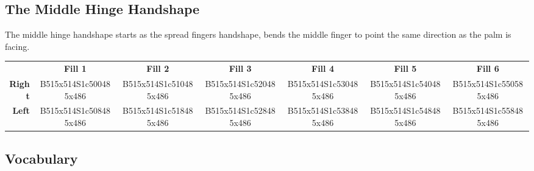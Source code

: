 \documentclass{article}
\begin{document}
\subsection{The Middle Hinge Handshape}

The middle hinge handshape starts as the spread fingers handshape, bends the middle finger to point the same direction as the palm is facing.

\begin{center}
\begin{tabular}{r*{6}{c}}
&\textbf{Fill 1}&\textbf{Fill 2}&\textbf{Fill 3}&\textbf{Fill 4}&\textbf{Fill 5}&\textbf{Fill 6}\\
\textbf{Right}&
B515x514S1c500485x486&
B515x514S1c510485x486&
B515x514S1c520485x486&
B515x514S1c530485x486&
B515x514S1c540485x486&
B515x514S1c550585x486\\
\textbf{Left}&
B515x514S1c508485x486&
B515x514S1c518485x486&
B515x514S1c528485x486&
B515x514S1c538485x486&
B515x514S1c548485x486&
B515x514S1c558485x486\\
\end{tabular}
\end{center}

\subsection{Vocabulary}
\end{document}
